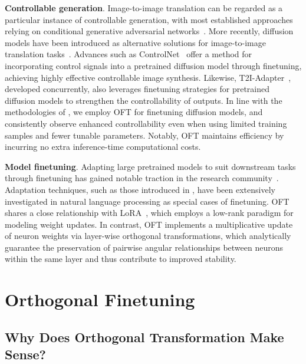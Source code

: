 \textbf{Controllable generation}. Image-to-image translation can be regarded as a particular instance of controllable generation, with most established approaches relying on conditional generative adversarial networks~\cite{isola2017image,zhu2017toward,wang2018high,park2019semantic,choi2018stargan}. More recently, diffusion models have been introduced as alternative solutions for image-to-image translation tasks~\cite{saharia2022palette,voynov2022sketch,wang2022pretraining}. Advances such as ControlNet~\cite{zhang2023adding} offer a method for incorporating control signals into a pretrained diffusion model through finetuning, achieving highly effective controllable image synthesis. Likewise, T2I-Adapter~\cite{mou2023t2i}, developed concurrently, also leverages finetuning strategies for pretrained diffusion models to strengthen the controllability of outputs. In line with the methodologies of \cite{zhang2023adding,mou2023t2i}, we employ OFT for finetuning diffusion models, and consistently observe enhanced controllability even when using limited training samples and fewer tunable parameters. Notably, OFT maintains efficiency by incurring no extra inference-time computational costs.

\textbf{Model finetuning}. Adapting large pretrained models to suit downstream tasks through finetuning has gained notable traction in the research community~\cite{devlin2018bert,brown2020language,he2022masked}. Adaptation techniques, such as those introduced in \cite{hulora2022,houlsby2019parameter,pfeiffer2020adapterfusion}, have been extensively investigated in natural language processing as special cases of finetuning. OFT shares a close relationship with LoRA~\cite{hulora2022}, which employs a low-rank paradigm for modeling weight updates. In contrast, OFT implements a multiplicative update of neuron weights via layer-wise orthogonal transformations, which analytically guarantee the preservation of pairwise angular relationships between neurons within the same layer and thus contribute to improved stability.

\section{Orthogonal Finetuning}

\subsection{Why Does Orthogonal Transformation Make Sense?}


